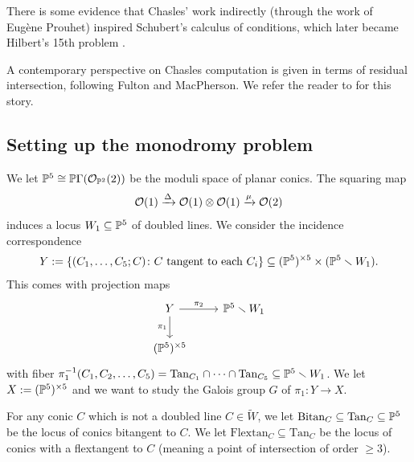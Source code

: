 \documentclass[11pt]{amsart}
\let\til\widetilde
\providecommand{\Bitan}{\mathrm{Bitan}}
\providecommand{\Flextan}{\mathrm{Flextan}}
\providecommand{\Tan}{\mathrm{Tan}}
\begin{document}
\begin{remark} There is some evidence that Chasles' work indirectly (through the work of Eugène Prouhet) inspired Schubert's calculus of conditions, which later became Hilbert's 15th problem \cite[p.~121]{Kleiman-Chasles}.
\end{remark}

A contemporary perspective on Chasles computation is given in terms of residual intersection, following Fulton and MacPherson. We refer the reader to \cite[13.5.5]{3264} for this story.


\subsection{Setting up the monodromy problem}

We let $\P^5 \cong \P\Gamma(\O_{\P^2}(2))$ be the moduli space of planar conics. The squaring map
\begin{align*}
    \O(1) \xto{\Delta} \O(1) \otimes \O(1) \xto{\mu} \O(2)
\end{align*}
induces a locus $W_1 \subseteq \P^5$ of doubled lines. We consider the incidence correspondence
\begin{align*}
    Y := \left\{ (C_1, \ldots, C_5;C) \colon C \text{ tangent to each }C_i \right\}\subseteq (\P^5)^{\times 5} \times (\P^5 \minus W_1).
\end{align*}
This comes with projection maps
\[ \begin{tikzcd}
    Y\dar["\pi_1" left]\rar["\pi_2" above] & \P^5\minus W_1\\
    (\P^5)^{\times 5} &
\end{tikzcd} \]
with fiber $\pi_1^{-1}(C_1,C_2, \ldots, C_5) = \Tan_{C_1}\cap \cdots \cap \Tan_{C_5} \subseteq \P^5 \minus W_1$. We let $X := (\P^5)^{\times5}$ and we want to study the Galois group $G$ of $\pi_1 \colon Y \to X$.


\begin{notation} 
For any conic $C$ which is not a doubled line $C \in \til{W}$, we let $\Bitan_C \subseteq \Tan_C \subseteq \P^5$ be the locus of conics bitangent to $C$. We let $\Flextan_C \subseteq \Tan_C$ be the locus of conics with a flextangent to  $C$ (meaning a point of intersection of order $\ge 3$).
\end{notation}
\end{document}
